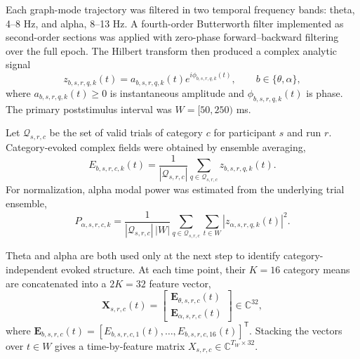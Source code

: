 \documentclass[11pt]{article}
\begin{document}
Each graph-mode trajectory was filtered in two temporal frequency bands: theta, 4--8 Hz, and alpha, 8--13 Hz. A fourth-order Butterworth filter implemented as second-order sections was applied with zero-phase forward--backward filtering over the full epoch. The Hilbert transform then produced a complex analytic signal
\begin{equation}
z_{b,s,r,q,k}(t)=a_{b,s,r,q,k}(t)e^{i\phi_{b,s,r,q,k}(t)},
\qquad b\in\{\theta,\alpha\},
\label{eq:analytic}
\end{equation}
where $a_{b,s,r,q,k}(t)\ge0$ is instantaneous amplitude and $\phi_{b,s,r,q,k}(t)$ is phase. The primary poststimulus interval was $W=[50,250)$ ms.

Let $\mathcal Q_{s,r,c}$ be the set of valid trials of category $c$ for participant $s$ and run $r$. Category-evoked complex fields were obtained by ensemble averaging,
\begin{equation}
E_{b,s,r,c,k}(t)=\frac{1}{|\mathcal Q_{s,r,c}|}
\sum_{q\in\mathcal Q_{s,r,c}}z_{b,s,r,q,k}(t).
\label{eq:categorymean}
\end{equation}
For normalization, alpha modal power was estimated from the underlying trial ensemble,
\begin{equation}
P_{\alpha,s,r,c,k}=\frac{1}{|\mathcal Q_{s,r,c}|\,|W|}
\sum_{q\in\mathcal Q_{s,r,c}}\sum_{t\in W}|z_{\alpha,s,r,q,k}(t)|^2.
\label{eq:power}
\end{equation}

Theta and alpha are both used only at the next step to identify category-independent evoked structure. At each time point, their $K=16$ category means are concatenated into a $2K=32$ feature vector,
\begin{equation}
\bm X_{s,r,c}(t)=
\begin{bmatrix}
\bm E_{\theta,s,r,c}(t)\\
\bm E_{\alpha,s,r,c}(t)
\end{bmatrix}
\in\mathbb C^{32},
\label{eq:concat}
\end{equation}
where $\bm E_{b,s,r,c}(t)=[E_{b,s,r,c,1}(t),\ldots,E_{b,s,r,c,16}(t)]^{\mathsf T}$. Stacking the vectors over $t\in W$ gives a time-by-feature matrix $X_{s,r,c}\in\mathbb C^{T_W\times32}$.
\end{document}
